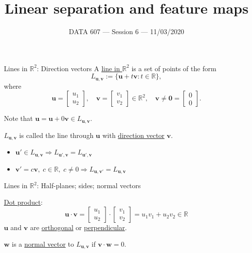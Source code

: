 \documentclass{beamer}
\newcommand{\vu}{\boldsymbol{u}}
\newcommand{\vv}{\boldsymbol{v}}
\newcommand{\vw}{\boldsymbol{w}}
\newcommand{\vzero}{\boldsymbol{0}}
\newcommand{\RR}{\mathbb{R}}
\begin{document}
\setlength{\parskip}{1em}
\begin{frame}
    \title{Linear separation and feature maps}
    \date{DATA 607 --- Session 6 --- 11/03/2020}
    \maketitle
\end{frame}

\begin{frame}{Lines in $\RR^2$: Direction vectors}
    A \underline{line in $\RR^2$} is a set of points of the form
    \[
        L_{\vu, \vv} := \{\vu + t\vv : t\in\RR\},
    \]
    where
    \[
        \vu=\begin{bmatrix}
            u_1\\u_2
        \end{bmatrix},\quad
        \vv=\begin{bmatrix}
            v_1\\v_2
        \end{bmatrix}\in\RR^2,\quad
        \vv\neq \vzero=\begin{bmatrix}
            0\\0
        \end{bmatrix}.
    \]

    Note that $\vu=\vu + 0\vv\in L_{\vu, \vv}$.

    $L_{\vu, \vv}$ is called the line through $\vu$ with \underline{direction vector} $\vv$.

    \begin{itemize}
        \item $\vu'\in L_{\vu, \vv} \Longrightarrow L_{\vu', \vv}=L_{\vu', \vv}$
        \item $\vv'=c\vv,\; c\in\RR,\; c\neq 0 \Longrightarrow L_{\vu, \vv'}=L_{\vu, \vv}$
    \end{itemize}
\end{frame}

\begin{frame}{Lines in $\RR^2$: Half-planes; sides; normal vectors}


    \underline{Dot product}:
    \[
        \vu\cdot\vv = \begin{bmatrix}
            u_1\\u_2
        \end{bmatrix}\cdot\begin{bmatrix}
            v_1\\v_2
        \end{bmatrix} = u_1 v_1 + u_2 v_2\in\RR
    \]
    $\vu$ and $\vv$ are \underline{orthogonal} or \underline{perpendicular}.

    $\vw$ is a \underline{normal vector} to $L_{\vu, \vv}$ if $\vv\cdot\vw = 0$.


\end{frame}
\end{document}
